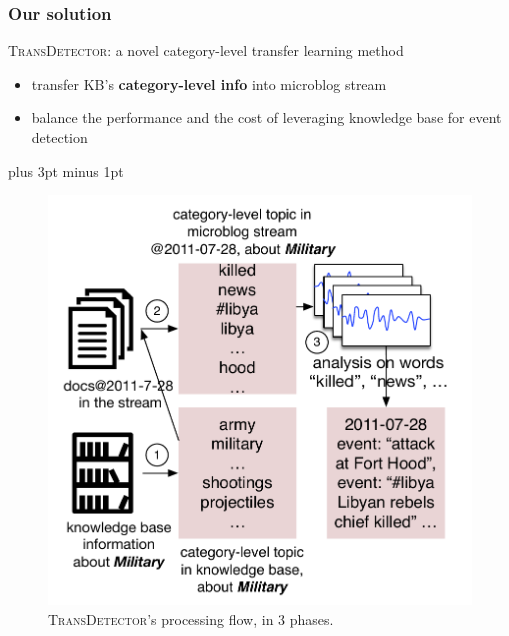\documentclass{beamer}
\begin{document}
\begin{frame}
\frametitle{Our solution}	
\textsc{TransDetector}: a novel category-level transfer learning method
\begin{itemize}
	\item transfer KB's \textbf{category-level info} into microblog stream
	\item balance the performance and the cost of leveraging knowledge base for event detection
\end{itemize}

\intextsep=5pt plus 3pt minus 1pt %
\begin{figure}[h]
		\setlength{\abovecaptionskip}{0.cm}
        \setlength{\belowcaptionskip}{0.cm}
        \centering
        \includegraphics[width=0.43\columnwidth]{img/NSDetectorExample.pdf}
        \caption{\textsc{TransDetector}'s processing flow, in 3 phases.}
        \label{fig:hood}
\end{figure}


\end{frame}
\end{document}
